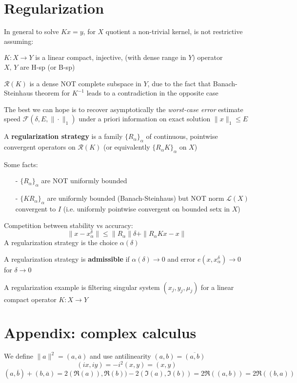 \section{Regularization}
In general to solve $Kx=y$, for $X$ quotient a non-trivial kernel, is not restrictive assuming:
\begin{center}
 $K:X\to Y$ is a linear compact, injective, (with dense range in $Y$) operator \\ $X,\,Y$ are H-sp (or B-sp)
\end{center}
\begin{remark}
 $\mathcal{R}(K)$ is a dense NOT complete subspace in $Y$, due to the fact that Banach-Steinhaus theorem for $K^{-1}$ leads to a contradiction in the opposite case
\end{remark}
The best we can hope is to recover asymptotically the \textit{worst-case error} estimate speed $\mathcal{F}(\delta,E,\| \cdot \|_1)$ under a priori information on exact solution $\| x \|_1\leq E$
\begin{definition}
 A \textbf{regularization strategy} is a family $\{R_\alpha\}_\alpha$ of continuous, pointwise convergent operators on $\mathcal{R}(K)$ (or equivalently $\{R_\alpha K\}_\alpha$ on $X$)
\end{definition}
\begin{remark}
 Some facts:
 \begin{itemize}
  \item[-] $\{R_\alpha\}_\alpha$ are NOT uniformly bounded
  \item[-] $\{KR_\alpha\}_\alpha$ are uniformly bounded (Banach-Steinhaus) but NOT norm $\mathcal{L}(X)$ convergent to $I$ (i.e. uniformly pointwise convergent on bounded setx in $X$)
 \end{itemize}
\end{remark}
Competition between stability vs accuracy:
\[\|x - x_\alpha^\delta \| \leq \| R_\alpha\|\delta + \| R_\alpha K x - x\| \]
A regularization strategy is the choice $\alpha(\delta)$
\begin{definition}
 A regularization strategy is \textbf{admissible} if $\alpha(\delta) \to 0$ and error $e(x,x_\alpha^\delta) \to 0$ for  $\delta\to 0$
\end{definition}
A regularization example is filtering singular system $(x_j,y_j,\mu_j)$ for a linear compact operator $K:X\to Y$
\section{Appendix: complex calculus}
We define $\| a \|^2 = (a, \overline{a})$ and use antilinearity $(a,b) = \overline{ (a,b) }$
\[(ix,iy)=-i^2(x,y)=(x,y)\]
\[ ( a,\overline{b} ) + (b,\overline{a}) = 2 (\Re(a)), \Re(b)) - 2(\Im(a),\Im(b)) = 2\Re((a,b)) = 2\Re((b,a))\]
